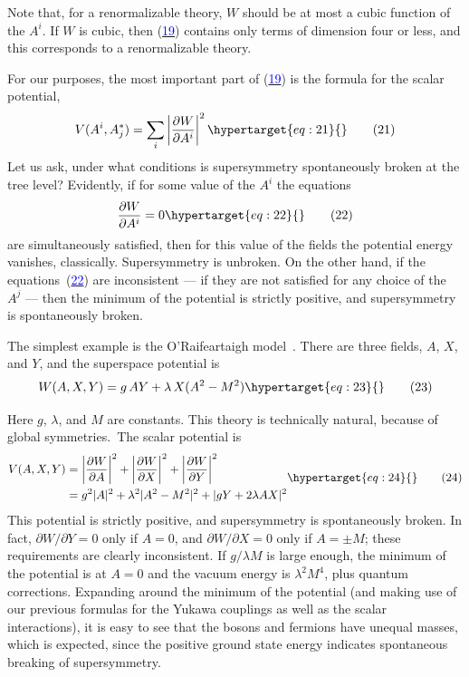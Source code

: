 \documentclass[11pt,a4paper]{article}
\newcommand{\eqtarget}[1]{\hypertarget{eq:#1}{\mathstrut}\tag{#1}}
\newcommand{\eqnref}[1]{(\hyperlink{eq:#1}{\textcolor{blue}{#1}})}
\newcommand{\asteriskfootnotemark}{\footnotemark[1]}
\begin{document}
Note that, for a renormalizable theory, $W$ should be at most a
cubic function of the $A^i$. If $W$ is cubic, then \eqnref{19} contains only
terms of dimension four or less, and this corresponds to a renormalizable
theory.

For our purposes, the most important part of \eqnref{19} is the formula
for the scalar potential,
\begin{equation}
V(A^i, A_j^*) = \sum_i \left|\frac{\partial W}{\partial A^i}\right|^2
\eqtarget{21}
\end{equation}
Let us ask, under what conditions is supersymmetry spontaneously
broken at the tree level? Evidently, if for some value of the $A^i$
the equations
\begin{equation}
\frac{\partial W}{\partial A^i} = 0
\eqtarget{22}
\end{equation}
are simultaneously satisfied, then for this value of the fields the
potential energy vanishes, classically. Supersymmetry is unbroken.
On the other hand, if the equations~\eqnref{22} are inconsistent --- if they
are not satisfied for any choice of the $A^j$ --- then the minimum of the
potential is strictly positive, and supersymmetry is spontaneously
broken.

The simplest example is the O'Raifeartaigh model~\cite{ref9}. There are
three fields, $A$, $X$, and $Y$, and the superspace potential is
\begin{equation}
W(A, X, Y) = g\, A Y + \lambda\, X (A^2 - M^2)
\eqtarget{23}
\end{equation}

Here $g$, $\lambda$, and $M$ are constants. This theory is technically natural,
because of global symmetries.\asteriskfootnotemark\ The scalar potential is
\begin{equation}
\begin{aligned}
V(A, X, Y) &= \left|\frac{\partial W}{\partial A}\right|^2 + \left|\frac{\partial W}{\partial X}\right|^2 + \left|\frac{\partial W}{\partial Y}\right|^2 \\
&= g^2 |A|^2 + \lambda^2 |A^2 - M^2|^2 + |gY + 2 \lambda A X|^2
\end{aligned}
\eqtarget{24}
\end{equation}
This potential is strictly positive, and supersymmetry is spontaneously
broken. In fact, $\partial W/\partial Y = 0$ only if $A = 0$, and $\partial W/\partial X = 0$
only if $A = \pm M$; these requirements are clearly inconsistent. If
$g/\lambda M$ is large enough, the minimum of the potential is at $A = 0$ and
the vacuum energy is $\lambda^2 M^4$, plus quantum corrections. Expanding
around the minimum of the potential (and making use of our previous
formulas for the Yukawa couplings as well as the scalar interactions),
it is easy to see that the bosons and fermions have unequal masses,
which is expected, since the positive ground state energy indicates
spontaneous breaking of supersymmetry.
\end{document}
